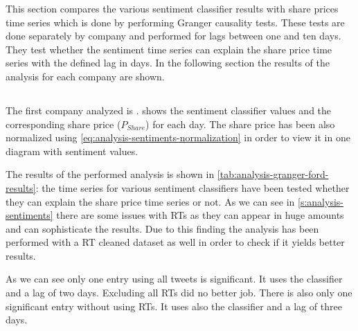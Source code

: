 This section compares the various sentiment classifier results with share prices time series which is done by performing Granger causality tests.
These tests are done separately by company and performed for lags between one and ten days.
They test whether the sentiment time series can explain the share price time series with the defined lag in days.
In the following section the results of the analysis for each company are shown.

\subsection{\ford}
\label{ss:analysis-granger-ford}

The first company analyzed is \ford{}.
 shows the sentiment classifier values and the corresponding share price ($P_{Share}$) for each day.
The share price has been also normalized using \cref{eq:analysis-sentiments-normalization} in order to view it in one diagram with sentiment values.

\begin{figure}[hbt]
    \centering
    
    \caption{\resultsCaption{\ford}}
    \label{fig:analysis-results-ford}
\end{figure} 

The results of the performed analysis is shown in \cref{tab:analysis-granger-ford-results}: 
the time series for various sentiment classifiers have been tested whether they can explain the share price time series or not.
As we can see in \cref{s:analysis-sentiments} there are some issues with \acp{RT} as they can appear in huge amounts and can sophisticate the results.
Due to this finding the analysis has been performed with a \ac{RT} cleaned dataset as well in order to check if it yields better results.

As we can see only one entry using all tweets is significant.
It uses the \nb{} classifier and a lag of two days.
Excluding all \acp{RT} did no better job.
There is also only one significant entry without using \acp{RT}.
It uses also the \nb{} classifier and a lag of three days.



